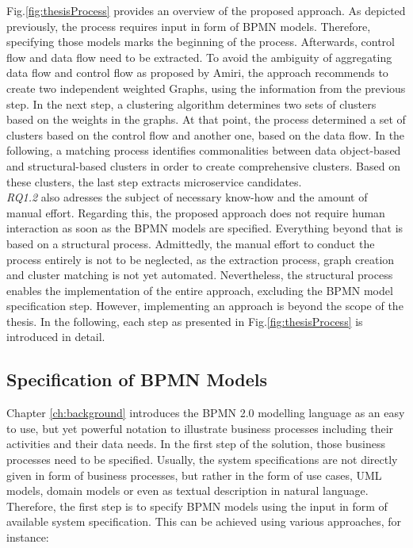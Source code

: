 \noindent
Fig.\ref{fig:thesisProcess} provides an overview of the proposed approach. As depicted previously, the process requires input in form of BPMN models. Therefore, specifying those models marks the beginning of the process. Afterwards, control flow and data flow need to be extracted. To avoid the ambiguity of aggregating data flow and control flow as proposed by Amiri\cite{ObjectAwareAmiri}, the approach recommends to create two independent weighted Graphs, using the information from the previous step. In the next step, a clustering algorithm determines two sets of clusters based on the weights in the graphs. At that point, the process determined a set of clusters based on the control flow and another one, based on the data flow. In the following, a matching process identifies commonalities between data object-based and structural-based clusters in order to create comprehensive clusters. Based on these clusters, the last step extracts microservice candidates. \\
\textit{RQ1.2} also adresses the subject of necessary know-how and the amount of manual effort. Regarding this, the proposed approach does not require human interaction as soon as the BPMN models are specified. Everything beyond that is based on a structural process.
Admittedly, the manual effort to conduct the process entirely is not to be neglected, as the extraction process, graph creation and cluster matching is not yet automated. Nevertheless, the structural process enables the implementation of the entire approach, excluding the BPMN model specification step. However, implementing an approach is beyond the scope of the thesis. In the following, each step as presented in Fig.\ref{fig:thesisProcess} is introduced in detail.


\subsection{Specification of BPMN Models}
\label{sec:Solution:SpecifyBPMN}
Chapter \ref{ch:background} introduces the BPMN 2.0 modelling language as an easy to use, but yet powerful notation to illustrate business processes including their activities and their data needs.
In the first step of the solution, those business processes need to be specified. Usually, the system specifications are not directly given in form of business processes, but rather in the form of use cases, UML models, domain models or even as textual description in natural language. Therefore, the first step is to specify BPMN models using the input in form of available system specification. This can be achieved using various approaches, for instance: \\





